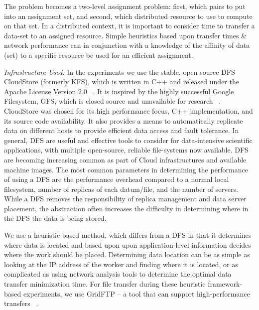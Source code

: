 \documentclass{rspublic}
\begin{document}
 
The problem becomes a two-level assignment problem: first, which pairs
to put into an assignment set, and second, which distributed resource
to use to compute on that set.  In a distributed context, it is
important to consider time to transfer a data-set to an assigned
resource.  Simple heuristics based upon transfer times \& network
performance can in conjunction with a knowledge of the affinity of
data (set) to a specific resource be used for an efficient assignment.



{\it Infrastructure Used: } In the experiments we use the stable,
open-source DFS CloudStore (formerly KFS), which is written in C++ and
released under the Apache License Version 2.0 ~\citep{cloudstore_web}.
It is inspired by the highly successful Google Filesystem, GFS, which
is closed source and unavailable for research ~\citep{GFS}. CloudStore
was chosen for its high performance focus, C++ implementation, and its
source code availability. It also provides a means to automatically
replicate data on different hosts to provide efficient data access and
fault tolerance. In general, DFS are useful and effective tools to
consider for data-intensive scientific applications, with multiple
open-source, reliable file-systems now available. DFS are becoming
increasing common as part of Cloud infrastructures and available
machine images. The most common parameters in determining the
performance of using a DFS are the performance overhead compared to a
normal local filesystem, number of replicas of each datum/file, and
the number of servers. While a DFS removes the responsibility of
replica management and data server placement, the abstraction often
increases the difficulty in determining where in the DFS the data is
being stored.


We use a heuristic based method, which differs from a DFS in that it
determines where data is located and based upon upon application-level
information decides where the work should be placed.
Determining data location can be as simple as looking at the IP
address of the worker and finding where it is located, or as
complicated as using network analysis tools to determine the optimal
data transfer minimization time. For file transfer during these
heuristic framework-based experiments, we use GridFTP -- a tool that
can support high-performance transfers ~\citep{gridftp_web}.
\end{document}
